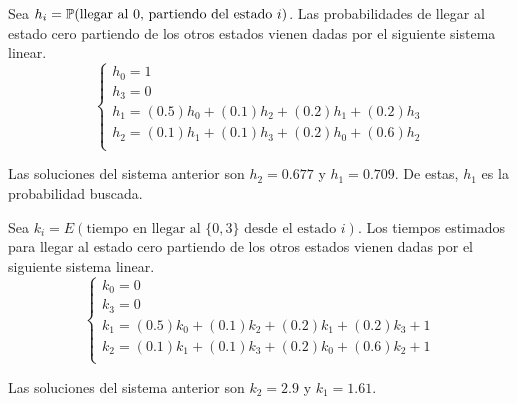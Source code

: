 \documentclass{scrartcl}
\begin{document}
\solution[a]
Sea $h_i = \mathbb{P}(\text{llegar al 0, partiendo del estado $i$})$.
Las probabilidades de llegar al estado cero partiendo de los otros estados
vienen dadas por el siguiente sistema linear.
\[
	\begin{cases}
		h_0 = 1\\
		h_3 = 0\\
		h_1 = (0.5)h_0 + (0.1)h_2 + (0.2)h_1 + (0.2)h_3\\
		h_2 = (0.1)h_1 + (0.1)h_3 + (0.2)h_0 + (0.6)h_2 \\
	\end{cases}	
\]

Las soluciones del sistema anterior son $h_2=0.677$ y $h_1 = 0.709$.
De estas, $h_1$ es la probabilidad buscada.

\solution[b]
Sea $k_i = E(\text{tiempo en llegar al $\{0,3\}$ desde el estado $i$})$.
Los tiempos estimados para llegar al estado cero partiendo de los otros estados
vienen dadas por el siguiente sistema linear.
\[
	\begin{cases}
		k_0 = 0\\
		k_3 = 0\\
		k_1 = (0.5)k_0 + (0.1)k_2 + (0.2)k_1 + (0.2)k_3 + 1\\
		k_2 = (0.1)k_1 + (0.1)k_3 + (0.2)k_0 + (0.6)k_2 + 1\\
	\end{cases}	
\]

Las soluciones del sistema anterior son $k_2=2.9$ y $k_1 = 1.61$.


\end{document}

